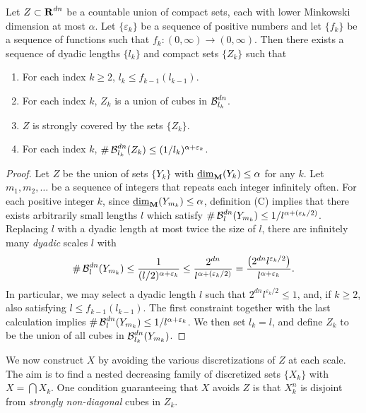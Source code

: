 \begin{lemma} \label{coveringlemma}
	Let $Z \subset \operatorname{\mathbf{R}}^{dn}$ be a countable union of compact sets, each with lower Minkowski dimension at most $\alpha$. Let $\{ \varepsilon_k \}$ be a sequence of positive numbers and let $\{ f_k \}$ be a sequence of functions such that $f_k \colon (0,\infty) \to (0,\infty)$. Then there exists a sequence of dyadic lengths $\{ l_k \}$ and compact sets $\{ Z_k \}$ such that
	\begin{enumerate}
		\item For each index $k \geq 2$, $l_k \leq f_{k-1}(l_{k-1})$.
		\item For each index $k$, $Z_k$ is a union of cubes in $\operatorname{\mathcal{B}}^{dn}_{l_k}$.
		\item $Z$ is strongly covered by the sets $\{ Z_k \}$.
		\item For each index $k$, $\# \operatorname{\mathcal{B}}^{dn}_{l_k}(Z_k) \leq (1/l_k)^{\alpha + \varepsilon_k}$.
	\end{enumerate}
\end{lemma}
\begin{proof}
	Let $Z$ be the union of sets $\{ Y_k \}$ with $\operatorname{\underline{\dim}_{\mathbf{M}}}(Y_k) \leq \alpha$ for any $k$. Let $m_1, m_2, \dots$ be a sequence of integers that repeats each integer infinitely often. For each positive integer $k$, since $\operatorname{\underline{\dim}_{\mathbf{M}}}(Y_{m_k}) \leq \alpha$, definition (C) implies that there exists arbitrarily small lengths $l$ which satisfy $\# \operatorname{\mathcal{B}}_l^{dn}(Y_{m_k}) \leq 1/l^{\alpha + (\varepsilon_k/2)}$. Replacing $l$ with a dyadic length at most twice the size of $l$, there are infinitely many {\it dyadic} scales $l$ with
	\[	\# \operatorname{\mathcal{B}}^{dn}_l(Y_{m_k}) \leq \frac{1}{(l/2)^{\alpha + \varepsilon_k}} \leq \frac{2^{dn}}{l^{\alpha + (\varepsilon_k/2)}} = \frac{\left( 2^{dn} l^{\varepsilon_k/2} \right)}{l^{\alpha + \varepsilon_k}}. \]
	In particular, we may select a dyadic length $l$ such that $2^{dn} l^{\varepsilon_k/2} \leq 1$, and, if $k \geq 2$, also satisfying $l \leq f_{k-1}(l_{k-1})$. The first constraint together with the last calculation implies $\# \operatorname{\mathcal{B}}^{dn}_l(Y_{m_k}) \leq 1/l^{\alpha + \varepsilon_k}$. We then set $l_k = l$, and define $Z_k$ to be the union of all cubes in $\operatorname{\mathcal{B}}_{l_k}^{dn}(Y_{m_k})$.
\end{proof}

We now construct $X$ by avoiding the various discretizations of $Z$ at each scale. The aim is to find a nested decreasing family of discretized sets $\{ X_k \}$ with $X = \bigcap X_k$. One condition guaranteeing that $X$ avoids $Z$ is that $X_k^n$ is disjoint from {\it strongly non-diagonal} cubes in $Z_k$.

